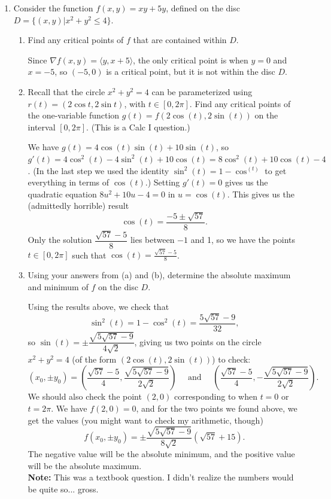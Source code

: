 \documentclass[letterpaper,12pt]{article}
\begin{document}
\begin{enumerate}
\begin{enumerate}
\end{enumerate}
 \item Consider the function $f(x,y)=xy+5y$, defined on the disc $D=\{(x,y) | x^2+y^2\leq 4\}$.
\begin{enumerate}
 \item Find any critical points of $f$ that are contained within $D$.

\bigskip

Since $\nabla f(x,y) = \langle y, x+5\rangle$, the only critical point is when $y=0$ and $x=-5$, so $(-5,0)$ is a critical point, but it is not within the disc $D$.

\bigskip

 \item Recall that the circle $x^2+y^2=4$ can be parameterized using $r(t) = (2\cos t, 2\sin t)$, with $t\in [0,2\pi]$. Find any critical points of the one-variable function $g(t) = f(2\cos(t),2\sin(t))$ on the interval $[0,2\pi]$. (This is a Calc I question.)

\bigskip

We have $g(t) = 4\cos(t)\sin(t)+10\sin(t)$, so $g'(t) = 4\cos^2(t)-4\sin^2(t)+10\cos(t) = 8\cos^2(t)+10\cos(t)-4$. (In the last step we used the identity $\sin^2(t) = 1-\cos^(t)$ to get everything in terms of $\cos(t)$.) Setting $g'(t)=0$ gives us the quadratic equation $8u^2+10u-4=0$ in $u=\cos(t)$. This gives us the (admittedly horrible) result
\[
 \cos(t) = \frac{-5\pm\sqrt{57}}{8}.
\]
Only the solution $\dfrac{\sqrt{57}-5}{8}$ lies between $-1$ and 1, so we have the points $t\in [0,2\pi]$ such that $\cos(t) = \frac{\sqrt{57}-5}{8}$.

 \item Using your answers from (a) and (b), determine the absolute maximum and minimum of $f$ on the disc $D$.

\bigskip

Using the results above, we check that
\[
 \sin^2(t) = 1-\cos^2(t) = \frac{5\sqrt{57}-9}{32},
\]
so $\sin(t) = \pm\dfrac{\sqrt{5\sqrt{57}-9}}{4\sqrt{2}}$, giving us two points on the circle $x^2+y^2=4$ (of the form $(2\cos (t), 2\sin(t))$) to check:
\[
 (x_0,\pm y_0) = \left(\frac{\sqrt{57}-5}{4},\frac{\sqrt{5\sqrt{57}-9}}{2\sqrt{2}}\right)\quad\text{ and }\quad \left(\frac{\sqrt{57}-5}{4},-\frac{\sqrt{5\sqrt{57}-9}}{2\sqrt{2}}\right).
\]
We should also check the point $(2,0)$ corresponding to when $t=0$ or $t=2\pi$. We have $f(2,0) = 0$, and for the two points we found above, we get the values (you might want to check my arithmetic, though)
\[
 f(x_0,\pm y_0) = \pm \frac{\sqrt{5\sqrt{57}-9}}{8\sqrt{2}}(\sqrt{57}+15).
\]
The negative value will be the absolute minimum, and the positive value will be the absolute maximum. \\
{\bf Note:} This was a textbook question. I didn't realize the numbers would be quite so... gross.
\end{enumerate}



\end{enumerate}
\end{document}

